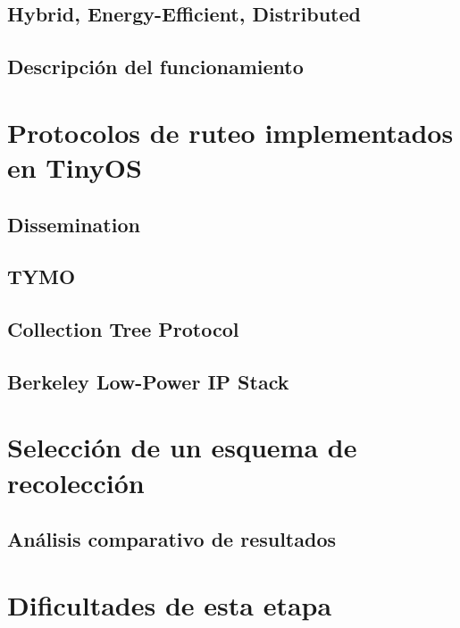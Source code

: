 \subsection{Hybrid, Energy-Efficient, Distributed}


\subsection{Descripción del funcionamiento}

\section{Protocolos de ruteo implementados en TinyOS}

\subsection{Dissemination }




\subsection{TYMO}



\subsection{Collection Tree Protocol}


\subsection{Berkeley Low-Power IP Stack}




\section{Selección de un esquema de recolección}

\subsection{Análisis comparativo de resultados}



\section{Dificultades de esta etapa}
